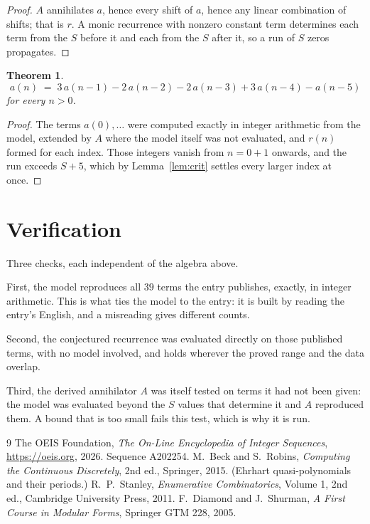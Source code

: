 \documentclass[11pt,a4paper]{article}
\theoremstyle{plain}
\newtheorem{theorem}{Theorem}
\theoremstyle{definition}
\begin{document}
\begin{proof}
$A$ annihilates $a$, hence every shift of $a$, hence any linear combination of shifts; that is
$r$. A monic recurrence with nonzero constant term determines each term from the $S$ before it
and each from the $S$ after it, so a run of $S$ zeros propagates.
\end{proof}

\begin{theorem}
\[
a(n)\;=\;3\,a(n-1) - 2\,a(n-2) - 2\,a(n-3) + 3\,a(n-4) - a(n-5)
\]
for every $n>0$.
\end{theorem}

\begin{proof}
The terms $a(0),\dots$ were computed exactly in integer arithmetic from the model, extended by
$A$ where the model itself was not evaluated, and $r(n)$ formed for each index. Those integers
vanish from $n=0+1$ onwards, and the run exceeds $S+5$, which by
Lemma~\ref{lem:crit} settles every larger index at once.
\end{proof}

\section{Verification}

Three checks, each independent of the algebra above.

First, the model reproduces all $39$ terms the entry publishes, exactly, in integer
arithmetic. This is what ties the model to the entry: it is built by reading the entry's
English, and a misreading gives different counts.

Second, the conjectured recurrence was evaluated directly on those published terms, with no
model involved, and holds wherever the proved range and the data overlap.

Third, the derived annihilator $A$ was itself tested on terms it had not been given: the model
was evaluated beyond the $S$ values that determine it and $A$ reproduced them. A bound that is
too small fails this test, which is why it is run.

\begin{thebibliography}{9}
 The OEIS Foundation, \emph{The On-Line Encyclopedia of Integer
Sequences}, \url{https://oeis.org}, 2026. Sequence A202254.
 M.~Beck and S.~Robins, \emph{Computing the Continuous Discretely},
2nd ed., Springer, 2015. (Ehrhart quasi-polynomials and their periods.)
 R.~P.~Stanley, \emph{Enumerative Combinatorics}, Volume 1, 2nd ed.,
Cambridge University Press, 2011.
 F.~Diamond and J.~Shurman, \emph{A First Course in Modular Forms},
Springer GTM 228, 2005.
\end{thebibliography}
\end{document}
